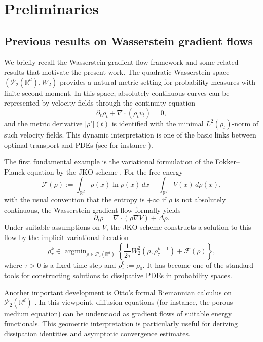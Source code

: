 \documentclass[11pt,reqno]{amsart}
\numberwithin{figure}{section}
\newcommand{\bbr}{\mathbb R}
\DeclareMathOperator*{\argmin}{argmin}
\begin{document}
\section{Preliminaries}\label{sec:2}
\setcounter{equation}{0}

\subsection{Previous results on Wasserstein gradient flows} \label{sec:2.1}

We briefly recall the Wasserstein gradient-flow framework and some related results that motivate the present work. The quadratic Wasserstein space $(\mathcal P_2(\mathbb R^d),W_2)$ provides a natural metric setting for probability measures with finite second moment. In this space, absolutely continuous curves can be represented by velocity fields through the continuity equation
\[
  \partial_t\rho_t+\nabla\cdot(\rho_t v_t)=0,
\]
and the metric derivative $|\rho'|(t)$ is identified with the minimal $L^2(\rho_t)$-norm of such velocity fields. This dynamic interpretation is one of the basic links between optimal transport and PDEs (see for instance \cite{AGS2005,santambrogio2017euclidean,Vil}).

The first fundamental example is the variational formulation of the Fokker--Planck equation by the JKO scheme \cite{JKO}. For the free energy
\[
\mathcal F(\rho) := \int_{\bbr^d}\rho(x)\ln\rho(x)\,dx
+ \int_{\bbr^d} V(x)\,d\rho(x),
\]
with the usual convention that the entropy is $+\infty$ if $\rho$ is not absolutely continuous, the Wasserstein gradient flow formally yields
\[
\partial_t\rho = \nabla\cdot(\rho\nabla V)+\Delta\rho.
\]
Under suitable assumptions on $V$, the JKO scheme constructs a solution to this flow by the implicit variational iteration
\[
\rho_\tau^k \in \argmin_{\rho\in \mathcal P_2(\bbr^d)}
\left\{
\frac{1}{2\tau}W_2^2(\rho,\rho_\tau^{k-1})+\mathcal F(\rho)
\right\},
\]
where $\tau>0$ is a fixed time step and $\rho_\tau^0:=\rho_0$. It has become one of the standard tools for constructing solutions to dissipative PDEs in probability spaces.

Another important development is Otto's formal Riemannian calculus on $\mathcal P_2(\mathbb R^d)$ \cite{otto2001geometry}. In this viewpoint, diffusion equations (for instance, the porous medium equation) can be understood as gradient flows of suitable energy functionals. This geometric interpretation is particularly useful for deriving dissipation identities and asymptotic convergence estimates. 
\end{document}
